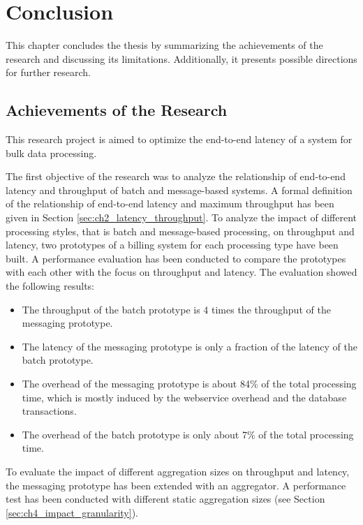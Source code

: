 \chapter{Conclusion}\label{ch:conclusion}

This chapter concludes the thesis by summarizing the achievements of the research and discussing its limitations. 
Additionally, it presents possible directions for further research. 

\section{Achievements of the Research}

This research project is aimed to optimize the end-to-end latency of a system for bulk data processing. 

The first objective of the research was to analyze the relationship of end-to-end latency and throughput of batch and message-based systems. A formal definition of the relationship of end-to-end latency and maximum throughput has been given in Section \ref{sec:ch2_latency_throughput}.
To analyze the impact of different processing styles, that is batch and message-based processing, on throughput and latency, two prototypes of a billing system for each processing type have been built. A performance evaluation has been conducted to compare the prototypes with each other with the focus on throughput and latency. The evaluation showed the following results:
\begin{itemize}
	\item The throughput of the batch prototype is 4 times the throughput of the messaging prototype.
	\item The latency of the messaging prototype is only a fraction of the latency of the batch prototype.
	\item The overhead of the messaging prototype is about 84\% of the total processing time, which is mostly induced by the webservice overhead and the database transactions. 
	\item The overhead of the batch prototype is only about 7\% of the total processing time.
\end{itemize}

To evaluate the impact of different aggregation sizes on throughput and latency, the messaging prototype has been extended with an aggregator. A performance test has been conducted with different static aggregation sizes (see Section \ref{sec:ch4_impact_granularity}).

